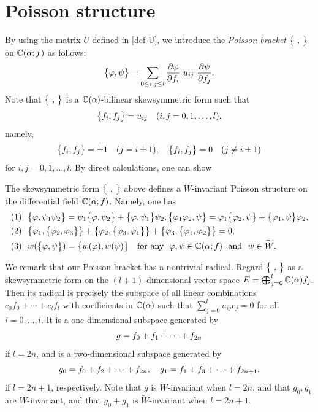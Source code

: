 \section{Poisson structure}
By using the matrix $U$ defined in \eqref{def-U}, we introduce the {\em Poisson bracket} 
$\big\{{ \ ,\  }\big\}$ on ${\Bbb C}(\alpha;f)$ as follows: 
\begin{equation}\Label{def-Pbr}
\Pbr{\varphi,\psi} = \sum_{0\le i,j \le l}
\frac{\partial \varphi}{\partial f_i}\ u_{ij}\ \frac{\partial \psi}{\partial f_j}. 
\end{equation}
Note that $\big\{{ \ ,\  }\big\}$ is a ${\Bbb C}(\alpha)$-bilinear skewsymmetric form such that
\begin{equation}
\big\{{ f_i,f_j }\big\}=u_{ij}\quad(i,j=0,1,\ldots,l),
\end{equation}
namely,
\begin{equation}\Label{Pbr-on-f}
\Pbr{f_i,f_j}=\pm 1\quad(j=i\pm1),\quad \Pbr{f_i,f_j}=0\quad(j\ne i\pm 1)
\end{equation}
for $i,j=0,1,\ldots,l$.
By direct calculations, one can show
\begin{prop} 
The skewsymmetric form $\big\{{ \ ,\  }\big\}$ above defines a $\widetilde{W}$-invariant 
Poisson structure on the differential field ${\Bbb C}(\alpha;f)$. 
Namely, one has
\begin{equation*}
\begin{align*}
(1)&\ \ 
\Pbr{\varphi,\psi_1\psi_2}=
\psi_1\Pbr{\varphi,\psi_2}+\Pbr{\varphi,\psi_1}\psi_2,
\Pbr{\varphi_1\varphi_2,\psi}=
\varphi_1\Pbr{\varphi_2,\psi}+\Pbr{\varphi_1,\psi}\varphi_2,\\
(2)&\ \ 
\Pbr{\varphi_1,\Pbr{\varphi_2,\varphi_3}}+
\Pbr{\varphi_2,\Pbr{\varphi_3,\varphi_1}}+
\Pbr{\varphi_3,\Pbr{\varphi_1,\varphi_2}}=0,\\
(3)&\ \ 
w(\Pbr{\varphi,\psi})=\Pbr{w(\varphi),w(\psi)} \quad
\text{for any}\ \  \varphi,\psi\in \BC(\alpha;f) \ \ \text{and} \ \ w\in \widetilde{W}. 
\end{align*}
\end{equation*}
\end{prop}

We remark that our Poisson bracket has a nontrivial radical. 
Regard $\big\{{ \ ,\  }\big\}$ as a skewsymmetric form on the $(l+1)$-dimensional 
vector space $E=\bigoplus_{j=0}^l {\Bbb C}(\alpha)f_j$. 
Then its radical is precisely the subspace of all linear combinations 
$c_0f_0+\cdots+c_l f_l$ with coefficients in ${\Bbb C}(\alpha)$  
such that $\sum_{j=0}^l u_{ij}c_j=0 $ for all $i=0,\ldots,l$.  
It is a one-dimensional subspace generated by
\begin{equation}\Label{def-g}
g=f_0+f_1+\cdots+f_{2n}
\end{equation}
if $l=2n$, and is a two-dimensional subspace generated by
\begin{equation}\Label{def-g01}
g_0=f_0+f_2+\cdots+f_{2n},\quad g_1=f_1+f_3+\cdots+f_{2n+1},
\end{equation}
if $l=2n+1$, respectively. 
Note that $g$ is $\widetilde{W}$-invariant when $l=2n$, and that
$g_0,g_1$ are $W$-invariant, and that $g_0+g_1$ is $\widetilde{W}$-invariant
when $l=2n+1$.

